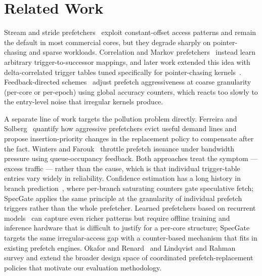 \section{Related Work}
Stream and stride prefetchers~\cite{stride1995} exploit constant-offset access patterns and remain the default in most commercial cores, but they degrade sharply on pointer-chasing and sparse workloads. Correlation and Markov prefetchers~\cite{markov1997} instead learn arbitrary trigger-to-successor mappings, and later work extended this idea with delta-correlated trigger tables tuned specifically for pointer-chasing kernels~\cite{ptt2017}. Feedback-directed schemes~\cite{gp2009} adjust prefetch aggressiveness at coarse granularity (per-core or per-epoch) using global accuracy counters, which reacts too slowly to the entry-level noise that irregular kernels produce.

A separate line of work targets the pollution problem directly. Ferreira and Solberg~\cite{pollution2015} quantify how aggressive prefetchers evict useful demand lines and propose insertion-priority changes in the replacement policy to compensate after the fact. Winters and Farouk~\cite{gem2019} throttle prefetch issuance under bandwidth pressure using queue-occupancy feedback. Both approaches treat the symptom --- excess traffic --- rather than the cause, which is that individual trigger-table entries vary widely in reliability. Confidence estimation has a long history in branch prediction~\cite{confbranch2001}, where per-branch saturating counters gate speculative fetch; SpecGate applies the same principle at the granularity of individual prefetch triggers rather than the whole prefetcher. Learned prefetchers based on recurrent models~\cite{mlprefetch2019} can capture even richer patterns but require offline training and inference hardware that is difficult to justify for a per-core structure; SpecGate targets the same irregular-access gap with a counter-based mechanism that fits in existing prefetch engines. Okafor and Renard~\cite{survey2021} and Lindqvist and Rahman~\cite{asplos2018prefetch} survey and extend the broader design space of coordinated prefetch-replacement policies that motivate our evaluation methodology.
